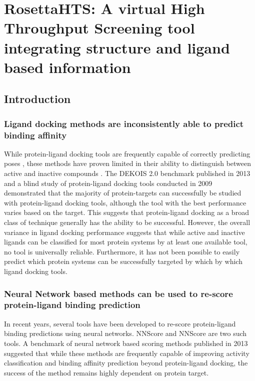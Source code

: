 \chapter{RosettaHTS: A virtual High Throughput Screening tool integrating structure and ligand based information}
\label{chap:rosetta_hts}
\section{Introduction}

\subsection{Ligand docking methods are inconsistently able to predict binding affinity}

While protein-ligand docking tools are frequently capable of correctly predicting poses \citep{Trott:2010km,Friesner:2004hm,Ewing:2001wu}, these methods have proven limited in their ability to distinguish between active and inactive compounds \citep{Bauer:2013de,Huang:2006gi,Davis:2009fx}.
The DEKOIS 2.0 benchmark published in 2013 \citep{Bauer:2013de} and a blind study of protein-ligand docking tools conducted in 2009 \citep{Davis:2009fx} demonstrated that the majority of protein-targets can successfully be studied with protein-ligand docking tools, although the tool with the best performance varies based on the target.
This suggests that protein-ligand docking as a broad class of technique generally has the ability to be successful. 
However, the overall variance in ligand docking performance suggests that while active and inactive ligands can be classified for most protein systems by at least one available tool, no tool is universally reliable.
Furthermore, it has not been possible to easily predict which protein systems can be successfully targeted by which by which ligand docking tools. 

\subsection{Neural Network based methods can be used to re-score protein-ligand binding prediction}

In recent years, several tools have been developed to re-score protein-ligand binding predictions using neural networks.
NNScore \citep{Durrant:2010js} and NNScore \citep{Durrant:2011dx} are two such tools.
A benchmark of neural network based scoring methods published in 2013 suggested that while these methods are frequently capable of improving activity classification and binding affinity prediction beyond protein-ligand docking, the success of the method remains highly dependent on protein target. \citep{Durrant:2013db}


